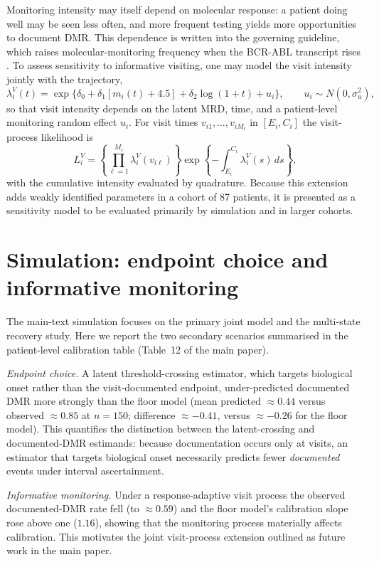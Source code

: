 \documentclass[11pt]{article}
\begin{document}
Monitoring intensity may itself depend on molecular response: a patient doing
well may be seen less often, and more frequent testing yields more
opportunities to document DMR. This dependence is written into the governing
guideline, which raises molecular-monitoring frequency when the BCR-ABL
transcript rises \cite{CSH2011CMLGuideline}. To assess sensitivity to
informative visiting, one may model the visit intensity jointly with the
trajectory,
\[
\lambda_i^V(t)=
\exp\{\delta_0+\delta_1[m_i(t)+4.5]+\delta_2\log(1+t)+u_i\},
\qquad u_i\sim N(0,\sigma_u^2),
\]
so that visit intensity depends on the latent MRD, time, and a patient-level
monitoring random effect $u_i$. For visit times $v_{i1},\ldots,v_{iM_i}$ in
$[E_i,C_i]$ the visit-process likelihood is
\[
L_i^V=
\left\{\prod_{\ell=1}^{M_i}\lambda_i^V(v_{i\ell})\right\}
\exp\left\{-\int_{E_i}^{C_i}\lambda_i^V(s)\,ds\right\},
\]
with the cumulative intensity evaluated by quadrature. Because this extension
adds weakly identified parameters in a cohort of 87 patients, it is presented
as a sensitivity model to be evaluated primarily by simulation and in larger
cohorts.

\section{Simulation: endpoint choice and informative monitoring}
\label{sec:s-sim}

The main-text simulation focuses on the primary joint model and the multi-state
recovery study. Here we report the two secondary scenarios summarised in the
patient-level calibration table (Table~12 of the main paper).

\emph{Endpoint choice.} A latent threshold-crossing estimator, which targets
biological onset rather than the visit-documented endpoint, under-predicted
documented DMR more strongly than the floor model (mean predicted $\approx0.44$
versus observed $\approx0.85$ at $n=150$; difference $\approx-0.41$, versus
$\approx-0.26$ for the floor model). This quantifies the distinction between the
latent-crossing and documented-DMR estimands: because documentation occurs only
at visits, an estimator that targets biological onset necessarily predicts fewer
\emph{documented} events under interval ascertainment.

\emph{Informative monitoring.} Under a response-adaptive visit process the
observed documented-DMR rate fell (to $\approx0.59$) and the floor model's
calibration slope rose above one ($1.16$), showing that the monitoring process
materially affects calibration. This motivates the joint visit-process
extension outlined as future work in the main paper.



\end{document}
